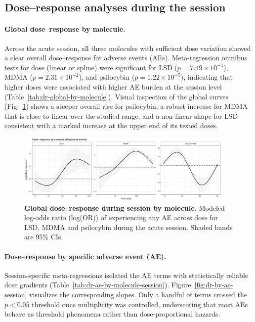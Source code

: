 \subsection{Dose–response analyses during the session}

\paragraph{Global dose–response by molecule.}
Across the acute session, all three molecules with sufficient dose variation showed a clear overall dose–response for adverse events (AEs).
Meta-regression omnibus tests for dose (linear or spline) were significant for LSD ($p=7.49\times10^{-4}$), MDMA ($p=2.31\times10^{-2}$), and psilocybin ($p=1.22\times10^{-5}$), indicating that higher doses were associated with higher AE burden at the session level (Table~\ref{tab:dr-global-by-molecule}).
Visual inspection of the global curves (Fig.~\ref{fig:dr-global-session}) shows a steeper overall rise for psilocybin, a robust increase for MDMA that is close to linear over the studied range, and a non-linear shape for LSD consistent with a marked increase at the upper end of its tested doses.

\begin{figure}[htb]
  \centering
  \includegraphics[width=0.94\textwidth]{figures/master_dr_by_molecule-session.pdf}
  \caption{\textbf{Global dose–response during session by molecule.}
  Modeled log-odds ratio (log(OR)) of experiencing any AE across dose for LSD, MDMA and psilocybin during the acute session. Shaded bands are 95\% CIs.}
  \label{fig:dr-global-session}
\end{figure}



\paragraph{Dose–response by specific adverse event (AE).}
Session-specific meta-regressions isolated the AE terms with statistically reliable dose gradients (Table~\ref{tab:dr-ae-by-molecule-session}).
Figure~\ref{fig:dr-by-ae-session} visualizes the corresponding slopes.
Only a handful of terms crossed the $p<0.05$ threshold once multiplicity was controlled, underscoring that most AEs behave as threshold phenomena rather than dose-proportional hazards.

